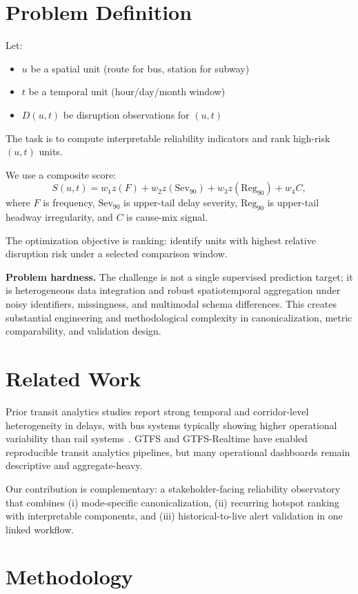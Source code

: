 \documentclass[sigconf]{acmart}
\begin{document}
\section{Problem Definition}

Let:
\begin{itemize}
    \item $u$ be a spatial unit (route for bus, station for subway)
    \item $t$ be a temporal unit (hour/day/month window)
    \item $D(u,t)$ be disruption observations for $(u,t)$
\end{itemize}

The task is to compute interpretable reliability indicators and rank high-risk $(u,t)$ units.

We use a composite score:
\[
S(u,t)=w_1 z(F)+w_2 z(\mathrm{Sev}_{90})+w_3 z(\mathrm{Reg}_{90})+w_4 C,
\]
where $F$ is frequency, $\mathrm{Sev}_{90}$ is upper-tail delay severity, $\mathrm{Reg}_{90}$ is upper-tail headway irregularity, and $C$ is cause-mix signal.

The optimization objective is ranking: identify units with highest relative disruption risk under a selected comparison window.

\textbf{Problem hardness.}
The challenge is not a single supervised prediction target; it is heterogeneous data integration and robust spatiotemporal aggregation under noisy identifiers, missingness, and multimodal schema differences. This creates substantial engineering and methodological complexity in canonicalization, metric comparability, and validation design.

\section{Related Work}
Prior transit analytics studies report strong temporal and corridor-level heterogeneity in delays, with bus systems typically showing higher operational variability than rail systems~\cite{carnegie2024ttc}. GTFS and GTFS-Realtime have enabled reproducible transit analytics pipelines, but many operational dashboards remain descriptive and aggregate-heavy.

Our contribution is complementary: a stakeholder-facing reliability observatory that combines (i) mode-specific canonicalization, (ii) recurring hotspot ranking with interpretable components, and (iii) historical-to-live alert validation in one linked workflow.

\section{Methodology}

\end{document}
